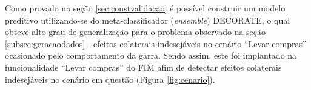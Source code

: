 Como provado na seção \ref{sec:constvalidacao} é possível construir um modelo preditivo utilizando-se do meta-classificador (\textit{ensemble}) DECORATE, o qual obteve alto grau de generalização para o problema observado na seção \ref{subsec:geracaodados} - efeitos colaterais indesejáveis no cenário ``Levar compras'' ocasionado pelo comportamento da garra. Sendo assim, este foi implantado na funcionalidade ``Levar compras'' do FIM afim de detectar efeitos colaterais indesejáveis no cenário em questão (Figura \ref{fig:cenario}).
